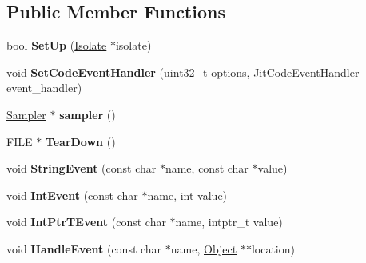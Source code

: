 \subsection*{Public Member Functions}
\begin{DoxyCompactItemize}
\item 
bool {\bfseries Set\+Up} (\hyperlink{classv8_1_1internal_1_1_isolate}{Isolate} $\ast$isolate)\hypertarget{classv8_1_1internal_1_1_logger_a57c1357e2efcb8f18a9463b3738de1c3}{}\label{classv8_1_1internal_1_1_logger_a57c1357e2efcb8f18a9463b3738de1c3}

\item 
void {\bfseries Set\+Code\+Event\+Handler} (uint32\+\_\+t options, \hyperlink{namespacev8_a39243bc91e63d64d111452fdb98c4733}{Jit\+Code\+Event\+Handler} event\+\_\+handler)\hypertarget{classv8_1_1internal_1_1_logger_a89f5788193b8b60cc23095b01b303278}{}\label{classv8_1_1internal_1_1_logger_a89f5788193b8b60cc23095b01b303278}

\item 
\hyperlink{classv8_1_1internal_1_1_sampler}{Sampler} $\ast$ {\bfseries sampler} ()\hypertarget{classv8_1_1internal_1_1_logger_acf51f58956bd045ccc28dda5ae9b8c6f}{}\label{classv8_1_1internal_1_1_logger_acf51f58956bd045ccc28dda5ae9b8c6f}

\item 
F\+I\+LE $\ast$ {\bfseries Tear\+Down} ()\hypertarget{classv8_1_1internal_1_1_logger_aecd345473e60fedd6cf022514b460ade}{}\label{classv8_1_1internal_1_1_logger_aecd345473e60fedd6cf022514b460ade}

\item 
void {\bfseries String\+Event} (const char $\ast$name, const char $\ast$value)\hypertarget{classv8_1_1internal_1_1_logger_aa5b4d8a0c983f1302a86943394481ef8}{}\label{classv8_1_1internal_1_1_logger_aa5b4d8a0c983f1302a86943394481ef8}

\item 
void {\bfseries Int\+Event} (const char $\ast$name, int value)\hypertarget{classv8_1_1internal_1_1_logger_a2131d6668b5dc5de810e87ebaeb532a5}{}\label{classv8_1_1internal_1_1_logger_a2131d6668b5dc5de810e87ebaeb532a5}

\item 
void {\bfseries Int\+Ptr\+T\+Event} (const char $\ast$name, intptr\+\_\+t value)\hypertarget{classv8_1_1internal_1_1_logger_add38edf4ef5cb1d654eb9cac76f53136}{}\label{classv8_1_1internal_1_1_logger_add38edf4ef5cb1d654eb9cac76f53136}

\item 
void {\bfseries Handle\+Event} (const char $\ast$name, \hyperlink{classv8_1_1internal_1_1_object}{Object} $\ast$$\ast$location)\hypertarget{classv8_1_1internal_1_1_logger_a9e188e7c13b6993687d7926dea865047}{}\label{classv8_1_1internal_1_1_logger_a9e188e7c13b6993687d7926dea865047}


\end{DoxyCompactItemize}
